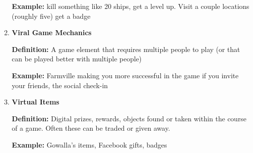 \begin{enumerate}
\textbf{Example:} kill something like 20 ships, get a level up. Visit a couple locations (roughly five) get a badge

\item \textbf{Viral Game Mechanics}

\textbf{Definition:} A game element that requires multiple people to play (or that can be played better with multiple people)

\textbf{Example:} Farmville making you more successful in the game if you invite your friends, the social check-in

\item \textbf{Virtual Items}

\textbf{Definition:} Digital prizes, rewards, objects found or taken within the course of a game. Often these can be traded or given away.

\textbf{Example:} Gowalla’s items, Facebook gifts, badges
\end{enumerate}